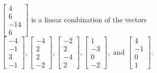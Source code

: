 \begin{exercise}
\begin{exerciseStatement}
  \end{exerciseStatement}
  \begin{exerciseAnswer}
   \(\left[\begin{array}{c}
4 \\
6 \\
-14 \\
6
\end{array}\right]\) 
  	 is  
	a linear combination of the vectors \(\left[\begin{array}{c}
-4 \\
-1 \\
3 \\
-1
\end{array}\right] , \left[\begin{array}{c}
-4 \\
2 \\
2 \\
-2
\end{array}\right] , \left[\begin{array}{c}
-2 \\
2 \\
-4 \\
2
\end{array}\right] , \left[\begin{array}{c}
1 \\
-3 \\
0 \\
-2
\end{array}\right] , \text{ and } \left[\begin{array}{c}
4 \\
-1 \\
0 \\
1
\end{array}\right]\).

	
  


  \end{exerciseAnswer}
\end{exercise}